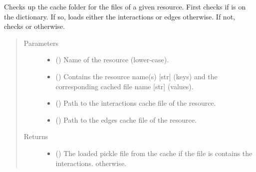 \documentclass[letterpaper,10pt,english]{sphinxmanual}
\begin{document}
\begin{fulllineitems}
\begin{fulllineitems}
\begin{quote}
\begin{description}
\end{description}\end{quote}

\end{fulllineitems}


\begin{fulllineitems}
\label{\detokenize{main:pypath.main.PyPath.lookup_cache}}
Checks up the cache folder for the files of a given resource.
First checks if  is on the  dictionary.
If so, loads either the interactions or edges otherwise. If
not, checks  or  otherwise.
\begin{quote}\begin{description}
\item[{Parameters}] \leavevmode\begin{itemize}
\item {} 
 () \textendash{} Name of the resource (lower-case).

\item {} 
 () \textendash{} Contains the resource name(s) {[}str{]} (keys) and the
corresponding cached file name {[}str{]} (values).

\item {} 
 () \textendash{} Path to the interactions cache file of the resource.

\item {} 
 () \textendash{} Path to the edges cache file of the resource.

\end{itemize}

\item[{Returns}] \leavevmode
\begin{itemize}
\item {} 
() \textendash{} The loaded pickle file from the cache if the
file is contains the interactions.  otherwise.


\end{itemize}
\end{description}
\end{quote}
\end{fulllineitems}
\end{fulllineitems}
\end{document}

